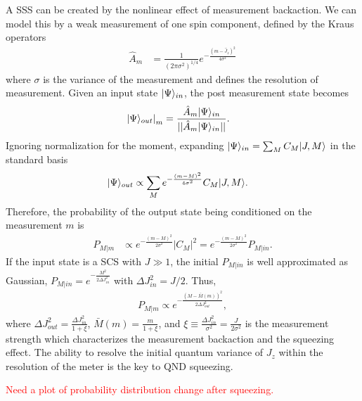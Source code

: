 A SSS can be created by the nonlinear effect of measurement backaction. We can model this by a weak measurement of one spin component, defined by the Kraus operators
\begin{align}\label{KrausOpSq}
\hat{A}_m &= \frac{1}{(2\pi \sigma^2)^{1/4}} e^{-\frac{(m-\hat{J}_z)^2}{4\sigma^2}}
\end{align}
where $ \sigma  $ is the variance of the measurement and defines the resolution of measurement. Given an input state $ \lvert{\Psi}\rangle_{in} $, the post measurement state becomes
\begin{align}
\left. \lvert{\Psi}\rangle_{out} \right|_m &= \frac{\hat{A}_m\lvert{\Psi}\rangle_{in}}{||\hat{A}_m\lvert{\Psi}\rangle_{in}|| }. 
\end{align}
Ignoring normalization for the moment, expanding $ \lvert{\Psi}\rangle_{in} = \sum_M C_{M} \lvert{J,M}\rangle $ in the standard basis
\begin{align}
\lvert{\Psi}\rangle_{out} &\propto \sum_M e^{-\frac{(m-M)^2}{4\sigma^2}} C_{M} \lvert{J,M}\rangle.
\end{align}
Therefore, the probability of the output state being conditioned on the measurement $ m $ is 
\begin{align}
P_{M|m} &\propto  e^{-\frac{(m-M)^2}{2\sigma^2}} |C_{M}|^2 = e^{-\frac{(m-M)^2}{2\sigma^2}} P_{M|in}.
\end{align}
If the input state is a SCS with $ J\gg 1 $, the initial $ P_{M|in} $ is well approximated as Gaussian, $ P_{M|in}=e^{-\frac{M^2}{2\Delta J_{in}^2}} $ with $ \Delta J_{in}^2=J/2 $. Thus,
\begin{align}
P_{M|m} \propto e^{-\frac{(M-\bar{M}(m))^2}{2\Delta J_{out}^2}},
\end{align}
where $ \Delta J_{out}^2 =\frac{\Delta J_{in}^2}{1+\xi} $, $ \bar{M}(m)=\frac{m}{1+\xi} $, and $ \xi\equiv \frac{\Delta J_{in}^2}{\sigma^2}=\frac{J}{2\sigma^2} $ is the measurement strength which characterizes the measurement backaction and the squeezing effect. The ability to resolve the initial quantum variance of $ J_z $ within the resolution of the meter is the key to QND squeezing. 

\textcolor{red}{Need a plot of probability distribution change after squeezing.}

